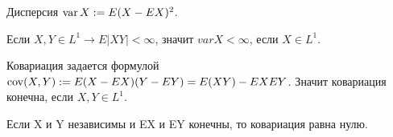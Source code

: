			
			\begin{definition}\label{lect8:def2}
			Дисперсия $\operatorname*{var} X := E(X-EX)^2$.
			 
			Если $X, Y \in L^1 \to E|XY|< \infty$, значит $varX < \infty$, если $X \in L^1$.
			\end{definition}
			
			\begin{definition}\label{lect8:def3}
			Ковариация задается формулой $\operatorname*{cov}(X,Y) := E(X-EX)(Y-EY) = E(XY) - EXEY$. Значит ковариация конечна, если $X,Y \in L^1$.
			 
			Если X и Y независимы и EX и EY конечны, то ковариация равна нулю.
			\end{definition}  
			
	